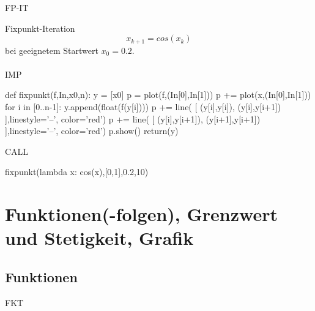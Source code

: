 \documentclass[fontsize=12pt,paper=a4,twoside,bibtotoc,idxtotoc,
liststotoc,pagesize,BCOR1.2cm,DIV15,chapterprefix,pagesize=pdftex]{scrbook}
\theoremstyle{plain}
\theoremstyle{definition}
\theoremstyle{remark}
\begin{document}
FP-IT

Fixpunkt-Iteration 
\[ x_{k+1}=cos(x_k) \]
bei geeignetem Startwert $x_0 = 0.2$.  \\
\\

IMP

\begin{small}
\begin{sagein}
def fixpunkt(f,In,x0,n):
    y = [x0]
    p = plot(f,(In[0],In[1]))
    p += plot(x,(In[0],In[1]))
    for i in [0..n-1]:
        y.append(float(f(y[i])))
        p += line( [ (y[i],y[i]), (y[i],y[i+1]) ],linestyle='--', color='red')
        p += line( [ (y[i],y[i+1]), (y[i+1],y[i+1]) ],linestyle='--', color='red')
    p.show()
    return(y)
\end{sagein}
\end{small}

CALL

\begin{sagein}
fixpunkt(lambda x: cos(x),[0,1],0.2,10)
\end{sagein}
\begin{sage}
[0.200000000000000, 0.98006657784124163, 0.55696725280964243, 0.84886216565827077, 0.66083755111661502, 0.78947843776686832, 0.70421571334199318, 0.76211956176066087, 0.72337417210557109, 0.74957657633149311, 0.73197742525819132]
\end{sage}


\chapter{Funktionen(-folgen), Grenzwert und Stetigkeit, Grafik}
\section{Funktionen}

FKT
\end{document}
